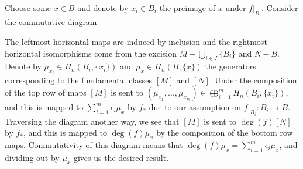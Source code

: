 \begin{homework}[e]
\begin{prf}
    Choose some $x \in B$ and denote by $x_i \in B_i$ the preimage of $x$ under $f|_{B_i}$. Consider the commutative diagram
    \begin{center}
    \end{center}
    The leftmost horizontal maps are induced by inclusion and the rightmost horizontal isomorphisms come from the excision $M - \bigcup_{i\in I}\{B_i\}$ and $N - B$. Denote by $\mu_{x_i} \in H_n(B_i,\{x_i\})$ and $\mu_{x} \in H_n(B,\{x\})$ the generators corresponding to the fundamental classes $[M]$ and $[N]$. Under the composition of the top row of maps $[M]$ is sent to $(\mu_{x_1},...,\mu_{x_m}) \in \bigoplus_{i=1}^m H_n(B_i,\{x_i\})$, and this is mapped to $\sum_{i=1}^m \epsilon_i \mu_x$ by $f_*$ due to our assumption on $f|_{B_i}:B_i \to B$. Traversing the diagram another way, we see that $[M]$ is sent to $\deg(f)[N]$ by $f_*$, and this is mapped to $\deg(f)\mu_x$ by the composition of the bottom row maps. Commutativity of this diagram means that $\deg(f)\mu_x = \sum_{i=1}^m \epsilon_i \mu_x$, and dividing out by $\mu_x$ gives us the desired result.
  \end{prf}
\end{homework}

